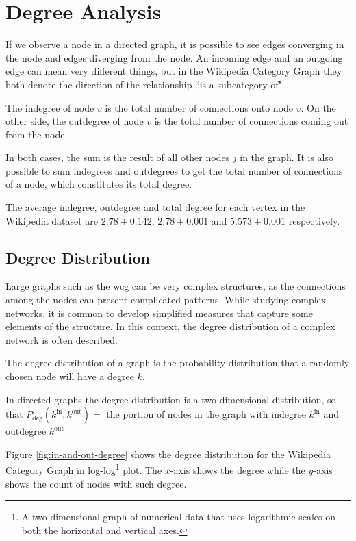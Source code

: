 \section{\hspace*{3pt} Degree Analysis}


If we observe a node in a directed graph, it is possible to see edges converging in the node and edges diverging from the node. An incoming edge and an outgoing edge can mean very different things, but in the Wikipedia Category Graph they both denote the direction of the relationship ``is a subcategory of". 

The indegree of node $v$ is the total number of connections onto node $v$.
On the other side, the outdegree of node $v$ is the total number of connections coming out from the node.

In both cases, the sum is the result of all other nodes $j$ in the graph. It is also possible to sum indegrees and outdegrees to get the total number of connections of a node, which constitutes its total degree.

The average indegree, outdegree and total degree for each vertex in the Wikipedia dataset are $2.78\pm0.142$, $2.78\pm0.001$ and $5.573\pm0.001$ respectively. 

\subsection{\hspace*{3pt}  Degree Distribution}

Large graphs such as the \gls{wcg} can be very complex structures, as the connections among the nodes can present complicated patterns. 
While studying complex networks, it is common to develop simplified measures that capture some elements of the structure. In this context, the degree distribution of a complex network is often described. 

The degree distribution of a graph is the probability distribution that a randomly chosen node will have a degree $k$. 

In directed graphs the degree distribution is a two-dimensional distribution, so that $P_{\text{deg}}(k^{\text{in}},k^{\text{out}} ) =$ the portion of nodes in the graph with indegree $k^{\text{in}}$ and outdegree $k^{\text{out}}$

Figure \ref{fig:in-and-out-degree} shows the degree distribution for the Wikipedia Category Graph in log-log\footnote{
A two-dimensional graph of numerical data that uses logarithmic scales on both the horizontal and vertical axes. 
} plot. The $x$-axis shows the degree while the $y$-axis shows the count of nodes with such degree. 

